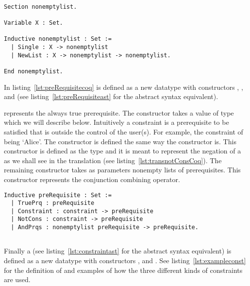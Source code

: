 \begin{minipage}[c]{0.95\textwidth}
\begin{lstlisting}

Section nonemptylist.

Variable X : Set.

Inductive nonemptylist : Set :=
  | Single : X -> nonemptylist 
  | NewList : X -> nonemptylist -> nonemptylist.

End nonemptylist.
\end{lstlisting}
\end{minipage}


In listing~\ref{lst:preRequisitecoq}  is defined as a new datatype with constructors , ,  and  (see listing~\ref{lst:preRequisiteast} for the abstract syntax equivalent).

 represents the always true prerequisite. The  constructor takes a value of type  which we will describe below. Intuitively a constraint is a prerequisite to be satisfied that is outside the control of the user(s). For example, the constraint of being `Alice'. The constructor  is defined the same way the  constructor is. This constructor is defined as the type  and it is meant to represent the negation of a  as we shall see in the translation (see listing~\ref{lst:transnotConsCoq}). The remaining constructor  takes as parameters nonempty lists of prerequisites. This constructor represents the conjunction combining operator. 


\lstset{language=Coq}
\begin{lstlisting}[frame=single, caption={preRequisite},label={lst:preRequisitecoq}]
Inductive preRequisite : Set :=
  | TruePrq : preRequisite
  | Constraint : constraint -> preRequisite 
  | NotCons : constraint -> preRequisite 
  | AndPrqs : nonemptylist preRequisite -> preRequisite.
  
\end{lstlisting}

Finally a  (see  listing~\ref{lst:constraintast} for the abstract syntax equivalent) is defined as a new datatype with constructors ,  and . See listing~\ref{lst:exampleconst} for the definition of  and examples of how the three different kinds of constraints are used.

